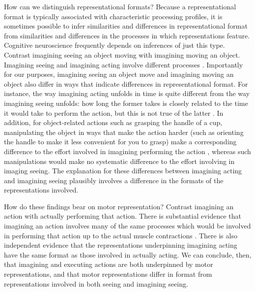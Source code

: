 \documentclass[12pt,\papersize]{extarticle}
\begin{document}
How can we distinguish representational formats? Because a representational format is typically associated with characteristic processing profiles, it is sometimes possible to infer similarities and differences in representational format from similarities and differences in the processes in which representations feature. 
Cognitive neuroscience frequently depends on inferences of just this type. Contrast imagining seeing an object moving with imagining moving an object. 
Imagining seeing and imagining acting involve different processes
 \citep{sirigu:2011_motor,nico:2004_left,vargas:2004s_influence,fourkas:2006_influence}. Importantly for our purposes, imagining seeing an object move and imagining moving an object also differ in ways that indicate differences in representational format. For instance, the way imagining acting unfolds in time is quite different from the way imagining seeing unfolds: how long the former takes is closely related to the time it would take to perform the action, but this is not true of the latter \citep{decety:1989_timing,decety:1996_imagined,Jeannerod:1994oz}. In addition, for object-related actions such as grasping the handle of a cup, manipulating the object in ways that make the action harder (such as orienting the handle to make it less convenient for you to grasp) make a corresponding difference to the effort involved in imagining performing the action \citep{parsons:1994_temporal,frak:2001_orientation}, whereas such manipulations would make no systematic difference to the effort involving in imaging seeing. The explanation for these differences between imagining acting and imagining seeing plausibly involves a difference in the formats of the representations involved.  

How do these findings bear on motor representation? Contrast imagining an action with actually performing that action. There is substantial evidence that imagining an action involves many of the same processes which would be involved in performing that action up to the actual muscle contractions \citep{jeannerod:1995_mental,jeannerod:2003_mechanism}. 
There is also independent evidence that the representations underpinning imagining acting have the same format as those involved in actually acting. 
We can conclude, then, that imagining and executing actions are both underpinned by motor representations, and that motor representations differ in format from representations involved in both seeing and imagining seeing. 
\end{document}

